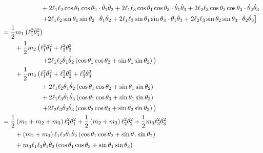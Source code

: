 \documentclass[letterpaper,8pt]{article}
\begin{document}
\begin{align*}
  & \qquad \qquad \qquad + 2 \ell_1\ell_2 \cos\theta_1\cos \theta_2 \cdot \dot{\theta}_1 \dot{\theta}_2 
                                      + 2 \ell_1\ell_3 \cos\theta_1\cos \theta_3 \cdot \dot{\theta}_1 \dot{\theta}_3 
                                      + 2 \ell_2\ell_3 \cos\theta_2\cos \theta_3 \cdot \dot{\theta}_2 \dot{\theta}_3 \\
  & \qquad \qquad \qquad \left. + 2 \ell_1\ell_2 \sin\theta_1\sin \theta_2 \cdot \dot{\theta}_1 \dot{\theta}_2 
                                      + 2 \ell_1\ell_3 \sin\theta_1\sin \theta_3 \cdot \dot{\theta}_1 \dot{\theta}_3 
                                      + 2 \ell_2\ell_3 \sin\theta_2\sin \theta_3 \cdot \dot{\theta}_2 \dot{\theta}_3 \vphantom{\ell_2^2} \right] \\
  &= \frac{1}{2} m_1 \left( \ell_1^2 \dot{\theta}_1^2 \right) \\
  & \qquad + \frac{1}{2} m_2 \left( \ell_1^2 \dot{\theta}_1^2 + \ell_2^2\dot{\theta}_2^2 \right. \\
  & \qquad \qquad \qquad \left. + 2\ell_1\ell_2\dot{\theta}_1\dot{\theta}_2\left(\cos\theta_1\cos \theta_2 + \sin\theta_1\sin \theta_2\right) \vphantom{\ell_2^2} \right) \\
  & \qquad + \frac{1}{2} m_3 \left( \ell_1^2 \dot{\theta}_1^2 + \ell_2^2 \dot{\theta}_2^2 + \ell_3^2 \dot{\theta}_3^2 \right. \\
  & \qquad \qquad \qquad + 2\ell_1\ell_2\dot{\theta}_1\dot{\theta}_2\left(\cos\theta_1\cos \theta_2 + \sin\theta_1\sin \theta_2\right) \\
  & \qquad \qquad \qquad + 2\ell_1\ell_3\dot{\theta}_1\dot{\theta}_3\left(\cos\theta_1\cos \theta_3 + \sin\theta_1\sin \theta_3\right) \\
  & \qquad \qquad \qquad \left. + 2\ell_2\ell_3\dot{\theta}_2\dot{\theta}_3\left(\cos\theta_2\cos \theta_3 + \sin\theta_2\sin \theta_3\right) \vphantom{\ell_2^2} \right) \\
  &= \frac{1}{2} \left( m_1 + m_2 + m_3 \right) \ell_1^2 \dot{\theta}_1^2 
                                      + \frac{1}{2} \left( m_2 + m_3 \right) \ell_2^2 \dot{\theta}_2^2 
                                      + \frac{1}{2} m_3 \ell_3^2 \dot{\theta}_3^2 \\
  & \qquad + \left( m_2 + m_3 \right) \ell_1\ell_2\dot{\theta}_1\dot{\theta}_2\left(\cos\theta_1\cos \theta_2 + \sin\theta_1\sin \theta_2\right) \\
  & \qquad + m_3 \ell_1\ell_3\dot{\theta}_1\dot{\theta}_3\left(\cos\theta_1\cos \theta_3 + \sin\theta_1\sin \theta_3\right) 

\end{align*}
\end{document}
